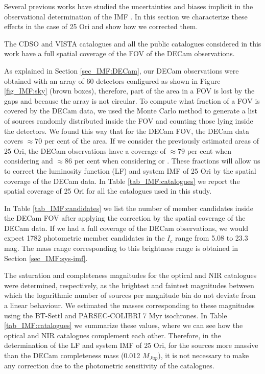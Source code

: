 \documentclass[12pt]{article}
\newcounter{subsubsubsection}[subsubsection]
\begin{document}
Several previous works have studied the uncertainties and biases implicit in the observational determination of the IMF \citep[e.g.][]{Moraux2003,Moraux2007a,Moraux2007b,Ascenso2011,Dib2017}. In this section we characterize these effects in the case of 25 Ori and show how we corrected them.

\label{sec_IMF:spatial}

The CDSO and VISTA catalogues and all the public catalogues considered in this work have a full spatial coverage of the FOV of the DECam observations.

As explained in Section \ref{sec_IMF:DECam}, our DECam observations were obtained with an array of 60 detectors configured as shown in Figure \ref{fig_IMF:sky} (brown boxes), therefore, part of the area in a FOV is lost by the gaps and because the array is not circular. To compute what fraction of a FOV is covered by the DECam data, we used the Monte Carlo method to generate a list of sources randomly distributed inside the FOV and counting those lying inside the detectors. We found this way that for the DECam FOV, the DECam data covers $\approx70$ per cent of the area. If we consider the previously estimated areas of 25 Ori, the DECam observations have a coverage of $\approx 79$ per cent when considering \citet[1.0$^\circ$ radius; ][]{Briceno2005,Briceno2007} and $\approx86$ per cent when considering \citet[0.7$^\circ$ radius; ][]{Briceno2018} or \citet[0.5$^\circ$ radius; ][]{Downes2014}. These fractions will allow us to correct the luminosity function (\ac{LF}) and system IMF of 25 Ori by the spatial coverage of the DECam data. In Table \ref{tab_IMF:catalogues} we report the spatial coverage of 25 Ori for all the catalogues used in this study.

In Table \ref{tab_IMF:candidates} we list the number of member candidates inside the DECam FOV after applying the correction by the spatial coverage of the DECam data. If we had a full coverage of the DECam observations, we would expect 1782 photometric member candidates in the $I_c$ range from 5.08 to 23.3 mag. The mass range corresponding to this brightness range is obtained in Section \ref{sec_IMF:sys-imf}.

\label{sec_IMF:sensitivity}

The saturation and completeness magnitudes for the optical and NIR catalogues were determined, respectively, as the brightest and faintest magnitudes between which the logarithmic number of sources per magnitude bin do not deviate from a linear behaviour. We estimated the masses corresponding to these magnitudes using the BT-Settl and PARSEC-COLIBRI 7 Myr isochrones. In Table \ref{tab_IMF:catalogues} we summarize these values, where we can see how the optical and NIR catalogues complement each other. Therefore, in the determination of the LF and system IMF of 25 Ori, for the sources more massive than the DECam completeness mass (0.012 $M_{Jup}$), it is not necessary to make any correction due to the photometric sensitivity of the catalogues.
\end{document}
